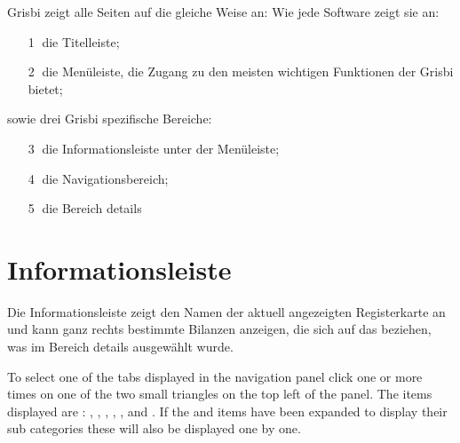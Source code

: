 
Grisbi zeigt alle Seiten auf die gleiche Weise an: Wie jede Software zeigt sie an:%

\begin{itemize}%
	\item[\large\textcircled{\small 1}] die Titelleiste;%
	\item[\large\textcircled{\small 2}] die Menüleiste, die Zugang zu den meisten wichtigen Funktionen der Grisbi bietet;%
\end{itemize}
sowie drei Grisbi spezifische Bereiche:%
\begin{itemize}%
	\item[\large\textcircled{\small 3}] die Informationsleiste unter der Menüleiste;%
	\item[\large\textcircled{\small 4}] die Navigationsbereich;%
	\item[\large\textcircled{\small 5}] die Bereich details%
\end{itemize}


\section{Informationsleiste\label{home-synthesis}}

Die Informationsleiste zeigt den Namen der aktuell angezeigten Registerkarte an und kann ganz rechts bestimmte Bilanzen anzeigen, die sich auf das beziehen, was im Bereich details ausgewählt wurde.%



To select one of the tabs displayed in the navigation panel click one or more times on one of the two small triangles on the top left of the panel.  The items displayed are : , , , , ,  and .  If the  and  items have been expanded to display their sub categories these will also be displayed one by one.

